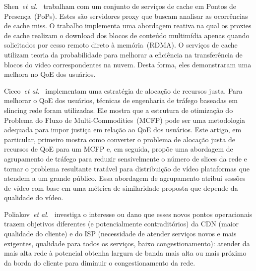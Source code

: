 Shen~\textit{et al.}~\cite{shenIWQoS19} trabalham com um conjunto de serviços de cache em Pontos de Presença~(PoPs). Estes são servidores proxy que buscam analisar as ocorrências de cache miss.
O trabalho implementa uma abordagem reativa na qual os proxies de cache realizam o download dos blocos de conteúdo multimídia apenas quando solicitados por cesso remoto direto à memória~(RDMA). 
O serviços de cache utilizam teoria da probabilidade 
para melhorar a eficiência na transferência de blocos do video correspondentes na nuvem. Desta forma, eles demonstraram uma melhora no QoE dos usuários.

Cicco~\textit{et al.}~\cite{cicco:2019:QRA} implementam uma estratégia de alocação de recursos justa. Para melhorar o QoE dos usuários, técnicas de engenharia de tráfego baseadas em slincing rede foram utilizadas. Ele mostra que a estrutura de otimização do Problema do Fluxo de Multi-Commodities~(MCFP) pode ser uma metodologia adequada para impor justiça em relação ao QoE dos usuários. Este artigo, em particular, primeiro mostra como converter o problema de alocação justa de recursos de QoE para um MCFP e, em seguida, propõe uma abordagem de agrupamento de tráfego para reduzir sensivelmente o número de slices da rede e tornar o problema resultante tratável para distribuição de vídeo plataformas que atendem a um grande público. Essa abordagem de agrupamento atribui sessões de vídeo com base em uma métrica de similaridade proposta que depende da qualidade do vídeo.


Poliakov~\textit{et al.}~\cite{poliakovPHD2018} 
investiga o interesse ou dano que esses novos pontos operacionais trazem objetivos diferentes (e potencialmente contraditórios) da CDN (maior qualidade do cliente) e do ISP (necessidade de atender serviços novos e mais exigentes, qualidade para todos os serviços, baixo congestionamento): atender da mais alta rede à potencial obtenha largura de banda mais alta ou mais próximo da borda do cliente para diminuir o congestionamento da rede.

